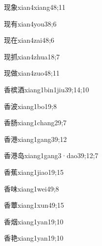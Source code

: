\begin{verbete}{现象}{xian4xiang4}{8;11}
\end{verbete}
\begin{verbete}{现有}{xian4you3}{8;6}
\end{verbete}
\begin{verbete}{现在}{xian4zai4}{8;6}
\end{verbete}
\begin{verbete}{现抓}{xian4zhua1}{8;7}
\end{verbete}
\begin{verbete}{现做}{xian4zuo4}{8;11}
\end{verbete}
\begin{verbete}{香槟酒}{xiang1bin1jiu3}{9;14;10}
\end{verbete}
\begin{verbete}{香波}{xiang1bo1}{9;8}
\end{verbete}
\begin{verbete}{香肠}{xiang1chang2}{9;7}
\end{verbete}
\begin{verbete}{香港}{xiang1gang3}{9;12}
\end{verbete}
\begin{verbete}{香港岛}{xiang1gang3·dao3}{9;12;7}
\end{verbete}
\begin{verbete}{香蕉}{xiang1jiao1}{9;15}
\end{verbete}
\begin{verbete}{香味}{xiang1wei4}{9;8}
\end{verbete}
\begin{verbete}{香蕈}{xiang1xun4}{9;15}
\end{verbete}
\begin{verbete}{香烟}{xiang1yan1}{9;10}
\end{verbete}
\begin{verbete}{香艳}{xiang1yan1}{9;10}
\end{verbete}
